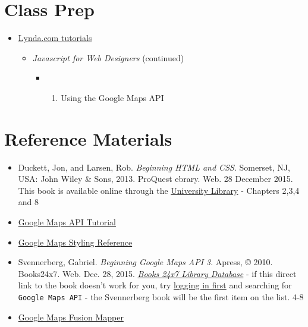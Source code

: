\documentclass[]{book}
\providecommand{\tightlist}{%
  \setlength{\itemsep}{0pt}\setlength{\parskip}{0pt}}
\begin{document}
\section{Class Prep}\label{week04-prep}

\begin{itemize}
\item
  \href{http://www.lynda.com/SharedPlaylist/2b710369c9ec4d8c964467225c6610ad?org=unm.edu}{Lynda.com
  tutorials}

  \begin{itemize}
  \tightlist
  \item
    \emph{Javascript for Web Designers} (continued)

    \begin{itemize}
    \item
      \begin{enumerate}
      \def\labelenumi{\arabic{enumi}.}
      \setcounter{enumi}{4}
      \tightlist
      \item
        Using the Google Maps API
      \end{enumerate}
    \end{itemize}
  \end{itemize}
\end{itemize}

\section{Reference Materials}\label{week04-reference}

\begin{itemize}
\item
  Duckett, Jon, and Larsen, Rob. \emph{Beginning HTML and CSS}.
  Somerset, NJ, USA: John Wiley \& Sons, 2013. ProQuest ebrary. Web. 28
  December 2015. This book is available online through the
  \href{http://site.ebrary.com.libproxy.unm.edu/lib/unma/detail.action?docID=10667426}{University
  Library} - Chapters 2,3,4 and 8
\item
  \href{http://code.google.com/apis/maps/documentation/javascript/tutorial.html}{Google
  Maps API Tutorial}
\item
  \href{https://developers.google.com/maps/documentation/javascript/styling}{Google
  Maps Styling Reference}
\item
  Svennerberg, Gabriel. \emph{Beginning Google Maps API 3}. Apress, ©
  2010. Books24x7. Web. Dec. 28, 2015.
  \href{http://library.books24x7.com.libproxy.unm.edu/toc.aspx?bookid=36390\&refid=SVA3S}{\emph{Books
  24x7 Library Database}} - if this direct link to the book doesn't work
  for you, try
  \href{http://library.unm.edu/applications/dam/plink.php?db_id=238}{logging
  in first} and searching for \texttt{Google\ Maps\ API} - the
  Svennerberg book will be the first item on the list. 4-8
\item
  \href{http://earth.google.com/outreach/tutorial_fusion_yourowndata.html}{Google
  Maps Fusion Mapper}
\end{itemize}
\end{document}
